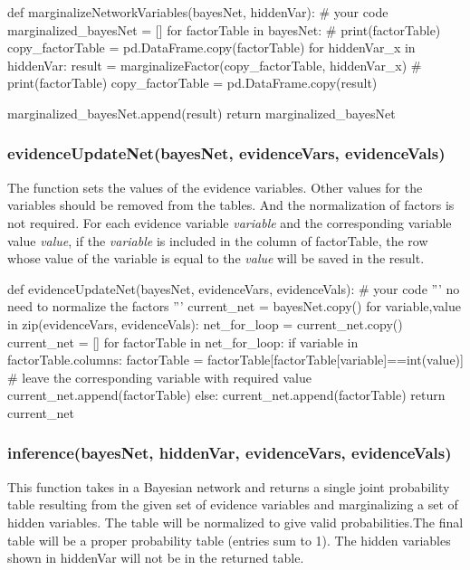 \documentclass[aps,letterpaper,10pt]{revtex4}
\begin{document}
\begin{python}
def marginalizeNetworkVariables(bayesNet, hiddenVar):
    # your code 
    marginalized_bayesNet = []
    for factorTable in bayesNet:
        # print(factorTable)
        copy_factorTable = pd.DataFrame.copy(factorTable)
        for hiddenVar_x in hiddenVar:
            result = marginalizeFactor(copy_factorTable, hiddenVar_x)
        # print(factorTable)
            copy_factorTable = pd.DataFrame.copy(result)

        marginalized_bayesNet.append(result)
    return marginalized_bayesNet
\end{python}

\subsubsection{evidenceUpdateNet(bayesNet, evidenceVars, evidenceVals)}
The function sets the values of the evidence variables. Other values for the variables should be removed from the tables. And the normalization of factors is not required. For each evidence variable \emph{variable} and the corresponding variable value \emph{value}, if the \emph{variable} is included in the column of factorTable, the row whose value of the variable is equal to the \emph{value} will be saved in the result.

\begin{python}
def evidenceUpdateNet(bayesNet, evidenceVars, evidenceVals):
    # your code 
    '''
    no need to normalize the factors
    '''
    current_net = bayesNet.copy()
    for variable,value in zip(evidenceVars, evidenceVals):
        net_for_loop = current_net.copy()
        current_net = []       
        for factorTable in net_for_loop:
            if variable in factorTable.columns:
                factorTable = factorTable[factorTable[variable]==int(value)] # leave the corresponding variable with required value
                current_net.append(factorTable)
            else:
                current_net.append(factorTable)
    return current_net
\end{python}

\subsubsection{inference(bayesNet, hiddenVar, evidenceVars, evidenceVals)}
This function takes in a Bayesian network and returns a single joint probability table resulting from the given set of evidence variables and marginalizing a set of hidden variables. 
The table will be normalized to give valid probabilities.The final table will be a proper probability table (entries sum
to 1). The hidden variables shown in hiddenVar will not be in the returned table. 
\end{document}
